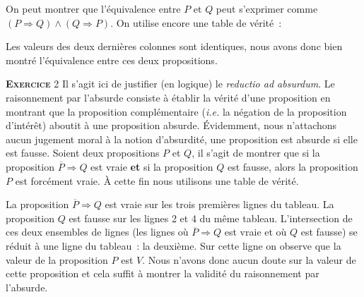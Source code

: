 \documentclass[10pt,a4paper,notitlepage]{article}
\newcommand{\exercice}[1]{\textsc{\textbf{Exercice}} #1}
\begin{document}
On peut montrer que l'équivalence entre $P$ et $Q$ peut s'exprimer
comme $ (P\Rightarrow Q) \land (Q\Rightarrow P)$. On utilise encore
une table de vérité :
\begin{table}[H]
  \centering
{}
\end{table}
Les valeurs des deux dernières colonnes sont identiques, nous avons
donc bien montré l'équivalence entre ces deux propositions.

\bigskip

\exercice{2} Il s'agit ici de justifier (en logique) le \emph{reductio
  ad absurdum}. Le raisonnement par l'absurde consiste à établir la
vérité d'une proposition en montrant que la proposition complémentaire
(\emph{i.e.} la négation de la proposition d'intérêt) aboutit à une
proposition absurde. Évidemment, nous n'attachons aucun jugement moral
à la notion d'absurdité, une proposition est absurde si elle est
fausse. Soient deux propositions $P$ et $Q$, il s'agit de
montrer que si la proposition $\overline{P} \Rightarrow Q$ est vraie
\textbf{et} si la proposition $Q$ est fausse, alors la proposition $P$
est forcément vraie. À cette fin nous utilisons une table de vérité.

\begin{table}[H]
  \centering
{}
\end{table}

La proposition $\overline{P}\Rightarrow Q$ est vraie sur les trois premières lignes du tableau. La proposition
$Q$ est fausse sur les lignes 2 et 4 du même tableau. L'intersection
de ces deux ensembles de lignes (les lignes où
$\overline{P}\Rightarrow Q$ est vraie et où
$Q$ est fausse) se réduit à une ligne du tableau : la deuxième. Sur
cette ligne on observe que la valeur de la proposition $P$ est
$V$. Nous n'avons donc aucun doute sur la valeur de cette proposition
et cela suffit à montrer la validité du raisonnement par l'absurde.
\end{document}
